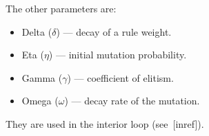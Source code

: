 The other parameters are:
\begin{itemize}
\item Delta ($\delta$) --- decay of a rule weight.
\item Eta ($\eta$) --- initial mutation probability.
\item Gamma ($\gamma$) --- coefficient of elitism.
\item Omega ($\omega$) --- decay rate of the mutation.
\end{itemize}

They are used in the interior loop (see~[inref]).

\begin{figure}
  \centering
\end{figure}
